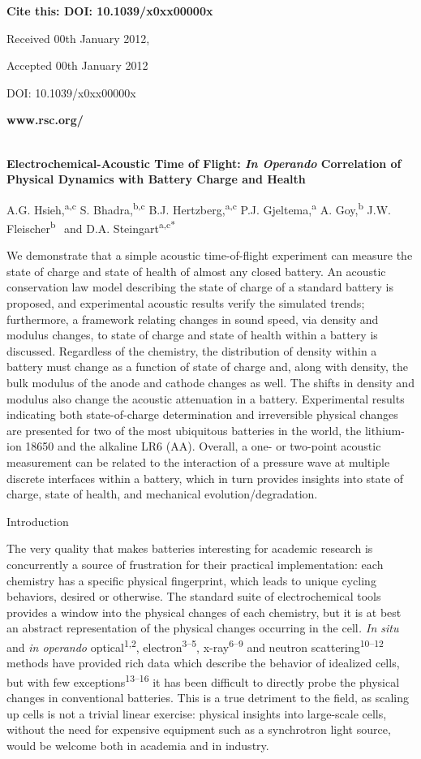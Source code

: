 \documentclass[]{article}
\date{}
\begin{document}
\textbf{Cite this: DOI: 10.1039/x0xx00000x}

Received 00th January 2012,

Accepted 00th January 2012

DOI: 10.1039/x0xx00000x

\textbf{www.rsc.org/}

{\\
 }\textbf{Electrochemical-Acoustic Time of Flight: \emph{In Operando}
Correlation of Physical Dynamics with Battery Charge and Health}

A.G. Hsieh,\textsuperscript{a,c} S. Bhadra,\textsuperscript{b,c} B.J.
Hertzberg,\textsuperscript{a,c} P.J. Gjeltema,\textsuperscript{a} A.
Goy,\textsuperscript{b} J.W. Fleischer\textsuperscript{b}
\textsuperscript{~}and D.A. Steingart\textsuperscript{a,c*}

We demonstrate that a simple acoustic time-of-flight experiment can
measure the state of charge and state of health of almost any closed
battery. An acoustic conservation law model describing the state of
charge of a standard battery is proposed, and experimental acoustic
results verify the simulated trends; furthermore, a framework relating
changes in sound speed, via density and modulus changes, to state of
charge and state of health within a battery is discussed. Regardless of
the chemistry, the distribution of density within a battery must change
as a function of state of charge and, along with density, the bulk
modulus of the anode and cathode changes as well. The shifts in density
and modulus also change the acoustic attenuation in a battery.
Experimental results indicating both state-of-charge determination and
irreversible physical changes are presented for two of the most
ubiquitous batteries in the world, the lithium-ion 18650 and the
alkaline LR6 (AA). Overall, a one- or two-point acoustic measurement can
be related to the interaction of a pressure wave at multiple discrete
interfaces within a battery, which in turn provides insights into state
of charge, state of health, and mechanical evolution/degradation.

Introduction

{ }The very quality that makes batteries interesting for academic
research is concurrently a source of frustration for their practical
implementation: each chemistry has a specific physical fingerprint,
which leads to unique cycling behaviors, desired or otherwise. The
standard suite of electrochemical tools provides a window into the
physical changes of each chemistry, but it is at best an abstract
representation of the physical changes occurring in the cell\emph{. In
situ} and \emph{in operando} optical\textsuperscript{1,2},
electron\textsuperscript{3--5}, x-ray\textsuperscript{6--9} and neutron
scattering\textsuperscript{10--12} methods have provided rich data which
describe the behavior of idealized cells, but with few
exceptions\textsuperscript{13--16} it has been difficult to directly
probe the physical changes in conventional batteries. This is a true
detriment to the field, as scaling up cells is not a trivial linear
exercise: physical insights into large-scale cells, without the need for
expensive equipment such as a synchrotron light source, would be welcome
both in academia and in industry.
\end{document}
